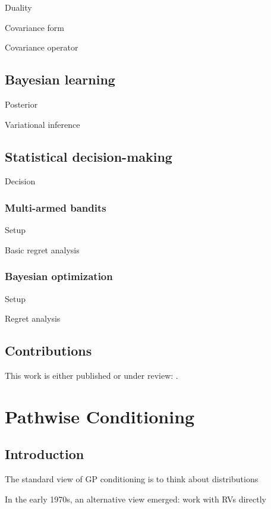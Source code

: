 \documentclass[11pt]{book}
\begin{document}
Duality

Covariance form

Covariance operator

\section{Bayesian learning}

Posterior

Variational inference

\section{Statistical decision-making}

Decision

\subsection{Multi-armed bandits}

Setup

Basic regret analysis

\subsection{Bayesian optimization}

Setup

Regret analysis

\section{Contributions}

This work is either published or under review: \textcite{wilson20,borovitskiy20,borovitskiy21,wilson21,hutchinson21}.



\chapter{Pathwise Conditioning}
\label{ch:pathwise}

\section{Introduction}

The standard view of GP conditioning is to think about distributions

In the early 1970s, an alternative view emerged: work with RVs directly
\end{document}

